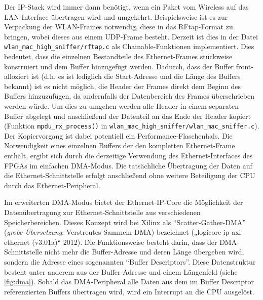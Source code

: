 \documentclass[ngerman,]{scrartcl}
\begin{document}
Der IP-Stack wird immer dann benötigt, wenn ein Paket vom Wireless auf
das LAN-Interface übertragen wird und umgekehrt. Beispielsweise ist es
zur Verpackung der WLAN-Frames notwendig, diese in das RFtap-Format zu
bringen, wobei dieses aus einem UDP-Frame besteht. Derzeit ist dies in
der Datei \texttt{wlan\_mac\_high\_sniffer/rftap.c} als
Chainable-Funktionen implementiert. Dies bedeutet, dass die einzelnen
Bestandteile des Ethernet-Frames stückweise konstruiert und dem Buffer
hinzugefügt werden. Dadurch, dass der Buffer front-alloziert ist (d.h.
es ist lediglich die Start-Adresse und die Länge des Buffers bekannt)
ist es nicht möglich, die Header der Frames direkt dem Beginn des
Buffers hinzuzufügen, da andernfalls der Datenbereich des Frames
überschrieben werden würde. Um dies zu umgehen werden alle Header in
einem separaten Buffer abgelegt und anschließend der Datenteil an das
Ende der Header kopiert (Funktion \texttt{mpdu\_rx\_process()} in
\texttt{wlan\_mac\_high\_sniffer/wlan\_mac\_sniffer.c}). Der
Kopiervorgang ist dabei potentiell ein Performance-Flaschenhals. Die
Notwendigkeit eines einzelnen Buffers der den kompletten Ethernet-Frame
enthält, ergibt sich durch die derzeitige Verwendung des
Ethernet-Interfaces des FPGAs im einfachen DMA-Modus. Die tatsächliche
Übertragung der Daten auf die Ethernet-Schnittstelle erfolgt
anschließend ohne weitere Beteiligung der CPU durch das
Ethernet-Peripheral.

Im erweiterten DMA-Modus bietet der Ethernet-IP-Core die Möglichkeit der
Datenübertragung zur Ethernet-Schnittstelle aus verschiedenen
Speicherbereichen. Dieses Konzept wird bei Xilinx als
``Scatter-Gather-DMA'' (\emph{grobe Übersetzung}:
Verstreutes-Sammeln-DMA) bezeichnet („logicore ip axi ethernet
(v3.01a)`` 2012). Die Funktionsweise besteht darin, dass der
DMA-Schnittstelle nicht mehr die Buffer-Adresse und deren Länge
übergeben wird, sondern die Adresse eines sogenannten ``Buffer
Descriptors''. Diese Datenstruktur besteht unter anderem aus der
Buffer-Adresse und einem Längenfeld (siehe
\cref{fig:dma}). Sobald das DMA-Peripheral alle Daten aus
dem im Buffer Descriptor referenzierten Buffers übertragen wird, wird
ein Interrupt an die CPU ausgelöst.
\end{document}
